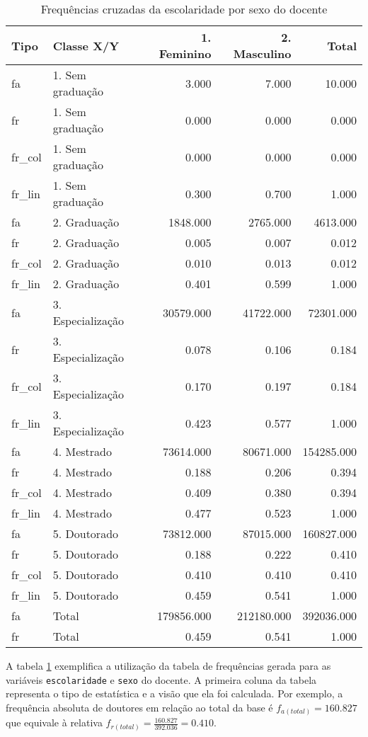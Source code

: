 \documentclass[12pt,]{style/krantz}
\theoremstyle{definition}
\theoremstyle{definition}
\theoremstyle{definition}
\theoremstyle{remark}
\begin{document}
\begin{table}[!h]

\caption{\label{tab:tab05}Frequências cruzadas da escolaridade por sexo do docente}
\centering
\begin{tabular}{llrrr}
\toprule
Tipo & Classe X/Y & 1. Feminino & 2. Masculino & Total\\
\midrule
fa & 1. Sem graduação & 3.000 & 7.000 & 10.000\\
fr & 1. Sem graduação & 0.000 & 0.000 & 0.000\\
fr\_col & 1. Sem graduação & 0.000 & 0.000 & 0.000\\
fr\_lin & 1. Sem graduação & 0.300 & 0.700 & 1.000\\
fa & 2. Graduação & 1848.000 & 2765.000 & 4613.000\\
\addlinespace
fr & 2. Graduação & 0.005 & 0.007 & 0.012\\
fr\_col & 2. Graduação & 0.010 & 0.013 & 0.012\\
fr\_lin & 2. Graduação & 0.401 & 0.599 & 1.000\\
fa & 3. Especialização & 30579.000 & 41722.000 & 72301.000\\
fr & 3. Especialização & 0.078 & 0.106 & 0.184\\
\addlinespace
fr\_col & 3. Especialização & 0.170 & 0.197 & 0.184\\
fr\_lin & 3. Especialização & 0.423 & 0.577 & 1.000\\
fa & 4. Mestrado & 73614.000 & 80671.000 & 154285.000\\
fr & 4. Mestrado & 0.188 & 0.206 & 0.394\\
fr\_col & 4. Mestrado & 0.409 & 0.380 & 0.394\\
\addlinespace
fr\_lin & 4. Mestrado & 0.477 & 0.523 & 1.000\\
fa & 5. Doutorado & 73812.000 & 87015.000 & 160827.000\\
fr & 5. Doutorado & 0.188 & 0.222 & 0.410\\
fr\_col & 5. Doutorado & 0.410 & 0.410 & 0.410\\
fr\_lin & 5. Doutorado & 0.459 & 0.541 & 1.000\\
\addlinespace
fa & Total & 179856.000 & 212180.000 & 392036.000\\
fr & Total & 0.459 & 0.541 & 1.000\\
\bottomrule
\end{tabular}
\end{table}

A tabela \ref{tab:tab05} exemplifica a utilização da tabela de
frequências gerada para as variáveis \texttt{escolaridade} e
\texttt{sexo} do docente. A primeira coluna da tabela representa o tipo
de estatística e a visão que ela foi calculada. Por exemplo, a
frequência absoluta de doutores em relação ao total da base é
\(f_{a(total)} = 160.827\) que equivale à relativa
\(f_{r(total)} = \frac{160.827}{392.036} = 0.410\).
\end{document}
